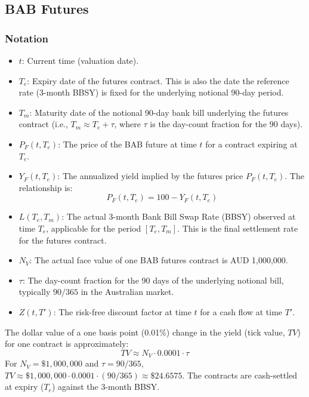 \documentclass[11pt, a4paper, british]{article}
\begin{document}
\newpage

\subsection{BAB Futures}

\subsubsection{Notation}
\begin{itemize}
 \item $t$: Current time (valuation date).
 \item $T_e$: Expiry date of the futures contract. This is also the date the reference rate (3-month BBSY) is fixed for the underlying notional 90-day period.
 \item $T_m$: Maturity date of the notional 90-day bank bill underlying the futures contract (i.e., $T_m \approx T_e + \tau$, where $\tau$ is the day-count fraction for the 90 days).
 \item $P_F(t, T_e)$: The price of the BAB future at time $t$ for a contract expiring at $T_e$.
 \item $Y_F(t, T_e)$: The annualized yield implied by the futures price $P_F(t, T_e)$. The relationship is:
 \begin{equation}
 P_F(t, T_e) = 100 - Y_F(t, T_e)
 \end{equation}
 \item $L(T_e, T_m)$: The actual 3-month Bank Bill Swap Rate (BBSY) observed at time $T_e$, applicable for the period $[T_e, T_m]$. This is the final settlement rate for the futures contract.
 \item $N_V$: The actual face value of one BAB futures contract is AUD 1,000,000.
 \item $\tau$: The day-count fraction for the 90 days of the underlying notional bill, typically $90/365$ in the Australian market.
 \item $Z(t, T')$: The risk-free discount factor at time $t$ for a cash flow at time $T'$.
\end{itemize}

The dollar value of a one basis point (0.01\%) change in the yield (tick value, $TV$) for one contract is approximately:
\begin{equation}
 TV \approx N_V \cdot 0.0001 \cdot \tau
\end{equation}
For $N_V = \$1,000,000$ and $\tau = 90/365$, $TV \approx \$1,000,000 \cdot 0.0001 \cdot (90/365) \approx \$24.6575$.
The contracts are cash-settled at expiry ($T_e$) against the 3-month BBSY.
\end{document}

